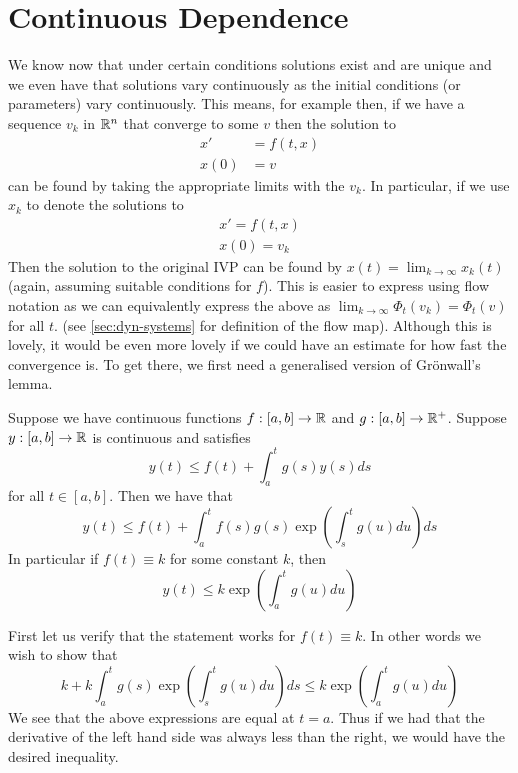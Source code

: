 \section{Continuous Dependence}
We know now that under certain conditions solutions exist and are unique and we even have that solutions vary continuously as the initial conditions (or parameters) vary continuously. This means, for example then, if we have a sequence $v_k$ in $\mathbb{R}^n$ that converge to some $v$ then the solution to 
\begin{align*}
    x' &= f(t, x)\\
    x(0) &= v
\end{align*}
can be found by taking the appropriate limits with the $v_k$. In particular, if we use $x_k$ to denote the solutions to 
\begin{align*}
    x' = f(t, x)\\
    x(0) = v_k
\end{align*}
Then the solution to the original IVP can be found by $x(t) = \lim_{k \to \infty} x_k(t)$ (again, assuming suitable conditions for $f$). This is easier to express using flow notation as we can equivalently express the above as $ \lim_{k \to \infty} \Phi_t(v_k) = \Phi_t(v)$ for all $t$. (see \autoref{sec:dyn-systems} for definition of the flow map). Although this is lovely, it would be even more lovely if we could have an estimate for how fast the convergence is. To get there, we first need a generalised version of Grönwall's lemma. 

\begin{theorem}\label{thm:big-gronwall}
    Suppose we have continuous functions $f: [a, b] \to \mathbb{R}$ and $g: [a, b] \to \mathbb{R}^+$. Suppose $y: [a, b] \to \mathbb{R}$ is continuous and satisfies
    $$ y(t) \leq f(t) + \int_a^t g(s) y(s) ds $$
    for all $t \in [a, b]$. Then we have that
    $$ y(t) \leq f(t) + \int_a^t f(s) g(s) \exp \left( \int_s^t g(u) du \right) ds $$
    In particular if $f(t) \equiv k$ for some constant $k$, then
    $$ y(t) \leq k \exp \left( \int_a^t g(u) du \right) $$
\end{theorem}
First let us verify that the statement works for $f(t) \equiv k$. In other words we wish to show that
$$ k + k \int_{a}^{t} g(s) \exp \left( \int_s^t g(u) du \right) ds \leq k \exp \left( \int_a^t g(u) du \right) $$
We see that the above expressions are equal at $t = a$. Thus if we had that the derivative of the left hand side was always less than the right, we would have the desired inequality.

